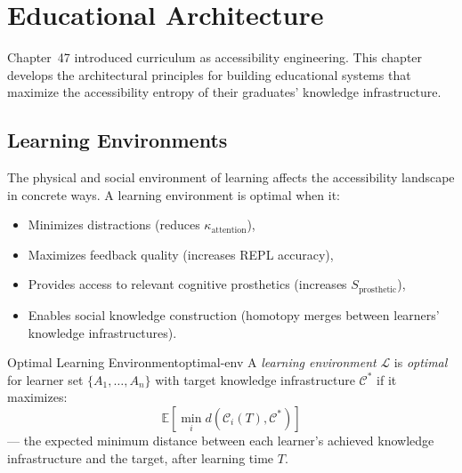 \chapter{Educational Architecture}



Chapter~47 introduced curriculum as accessibility engineering. This chapter
develops the architectural principles for building educational systems
that maximize the accessibility entropy of their graduates' knowledge
infrastructure.

\section{Learning Environments}

The physical and social environment of learning affects the accessibility
landscape in concrete ways. A learning environment is optimal when it:
\begin{itemize}
  \item Minimizes distractions (reduces $\kappa_\text{attention}$),
  \item Maximizes feedback quality (increases REPL accuracy),
  \item Provides access to relevant cognitive prosthetics (increases
        $S_\text{prosthetic}$),
  \item Enables social knowledge construction (homotopy merges between
        learners' knowledge infrastructures).
\end{itemize}

\begin{definition}{Optimal Learning Environment}{optimal-env}
  A \emph{learning environment} $\mathcal{L}$ is \emph{optimal} for
  learner set $\{A_1, \ldots, A_n\}$ with target knowledge infrastructure
  $\mathcal{C}^*$ if it maximizes:
  \[
    \mathbb{E}\left[\min_i d(\mathcal{C}_i(T), \mathcal{C}^*)\right]
  \]
  — the expected minimum distance between each learner's achieved
  knowledge infrastructure and the target, after learning time $T$.
\end{definition}

